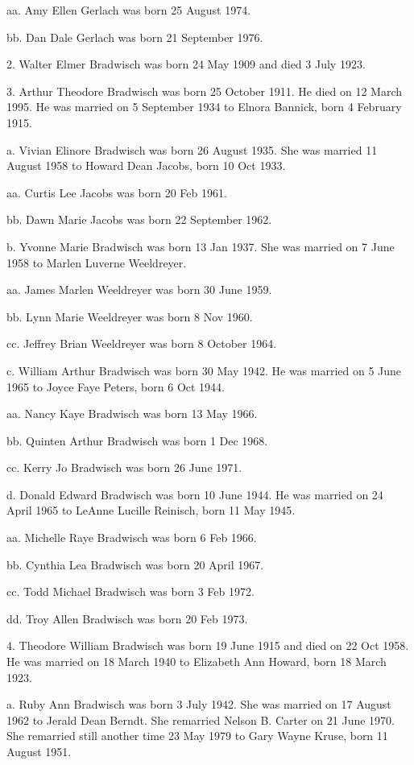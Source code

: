 \documentclass[a4paper]{article}
\begin{document}
aa. Amy Ellen Gerlach was born 25 August 1974.

bb. Dan Dale Gerlach was born 21 September 1976.

2. Walter Elmer Bradwisch was born 24 May 1909 and died 3 July 1923.

3. Arthur Theodore Bradwisch was born 25 October 1911.  He died on 12 March 1995. He was married on 5 September 1934 to Elnora Bannick, born 4 February 1915.

a. Vivian Elinore Bradwisch was born 26 August 1935.  She was married 11 August 1958 to Howard Dean Jacobs, born 10 Oct 1933.

aa. Curtis Lee Jacobs was born 20 Feb 1961.

bb. Dawn Marie Jacobs was born 22 September 1962.

b. Yvonne Marie Bradwisch was born 13 Jan 1937.  She was married on 7 June 1958 to Marlen Luverne Weeldreyer.
 
aa. James Marlen Weeldreyer was born 30 June 1959.

bb. Lynn Marie Weeldreyer was born 8 Nov 1960.

cc. Jeffrey Brian Weeldreyer was born 8 October 1964.

c. William Arthur Bradwisch was born 30 May 1942.  He was married on 5 June 1965 to Joyce Faye Peters, born 6 Oct 1944.

aa. Nancy Kaye Bradwisch was born 13 May 1966.

bb. Quinten Arthur Bradwisch was born 1 Dec 1968.

cc. Kerry Jo Bradwisch was born 26 June 1971.

d. Donald Edward Bradwisch was born 10 June 1944.  He was married on 24 April 1965 to LeAnne Lucille Reinisch, born 11 May 1945.
 
aa. Michelle Raye Bradwisch was born 6 Feb 1966.

bb. Cynthia Lea Bradwisch was born 20 April 1967.

cc. Todd Michael Bradwisch was born 3 Feb 1972.

dd. Troy Allen Bradwisch was born 20 Feb 1973.

4. Theodore William Bradwisch was born 19 June 1915 and died on 22 Oct 1958. He was married on 18 March 1940 to Elizabeth Ann Howard, born 18 March 1923.

a. Ruby Ann Bradwisch was born 3 July 1942.  She was married on 17 August 1962 to Jerald Dean Berndt. She remarried Nelson B. Carter on 21 June 1970.  She remarried still another time 23 May 1979 to Gary Wayne Kruse, born 11 August 1951.  
\end{document}
